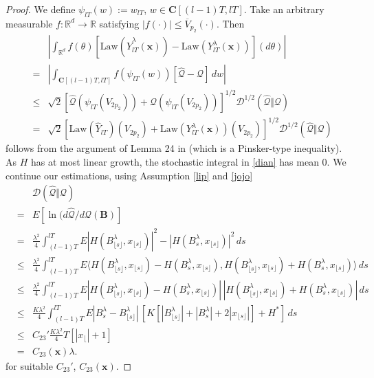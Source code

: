 \documentclass[a4paper,draft]{article}
\begin{document}
\begin{proof}
We define $\psi_{lT}(w):=w_{lT}$, $w\in\mathbf{C}[(l-1)T,lT]$.
Take an arbitrary measurable $f:\mathbb{R}^d\to\mathbb{R}$ satisfying 
$|f(\cdot)|\leq \overline{V}_{p_2}(\cdot)$. Then 
\begin{eqnarray*}
& & \left| \int_{\mathbb{R}^d} f(\theta)
[\mathrm{Law}(\hat{Y}_{lT}^{\lambda}(\mathbf{x}))-\mathrm{Law}({Y}_{lT}^{\lambda}(\mathbf{x}))](d\theta)\right|\\
&=& 
\left| \int_{\mathbf{C}[(l-1)T,lT]} f(\psi_{lT}(w))[\hat{\mathcal{Q}}-
\mathcal{Q}]\, dw\right|\\
&\leq & \sqrt{2}[\hat{\mathcal{Q}}(\psi_{lT}(V_{2p_2}))+\mathcal{Q}(\psi_{lT}(V_{2p_2}))]^{1/2}
\mathcal{D}^{1/2}(\hat{\mathcal{Q}}\Vert\mathcal{Q})\\
&=& \sqrt{2}[\mathrm{Law}(\hat{Y}_{lT})(V_{2p_2})+\mathrm{Law}({Y}^{\lambda}_{lT}(\mathbf{x}))(V_{2p_2})]^{1/2}
\mathcal{D}^{1/2}(\hat{\mathcal{Q}}\Vert \mathcal{Q})
\end{eqnarray*}
follows from the argument of Lemma 24 in \cite{unadjusted} (which is a Pinsker-type inequality).
As $H$ has at most linear growth, the stochastic integral in \eqref{dian} 
has mean $0$. We continue our estimations, using Assumption \ref{lip} and \eqref{jojo}
\begin{eqnarray*}
& & \mathcal{D}(\hat{\mathcal{Q}}\Vert\mathcal{Q})\\
&=& E[\ln(d\hat{\mathcal{Q}}/d\mathcal{Q}(\mathbf{B})]\\
&=& \frac{\lambda^2}{4}\int_{(l-1)T}^{lT} 
E|H(B^{\lambda}_{\lfloor s\rfloor},x_{\lfloor s\rfloor})|^2
-|H(B^{\lambda}_s,x_{\lfloor s\rfloor})|^2\, ds\\
&\leq& \frac{\lambda^2}{4}\int_{(l-1)T}^{lT} 
E\langle H(B^{\lambda}_{\lfloor s\rfloor},x_{\lfloor s\rfloor})
-H(B^{\lambda}_s,x_{\lfloor s\rfloor}),H(B^{\lambda}_{\lfloor s\rfloor},x_{\lfloor s\rfloor})
+H(B^{\lambda}_s,x_{\lfloor s\rfloor})\rangle\, ds\\
&\leq& 
\frac{\lambda^2}{4}\int_{(l-1)T}^{lT} 
E|H(B^{\lambda}_{\lfloor s\rfloor},x_{\lfloor s\rfloor})
-H(B^{\lambda}_s,x_{\lfloor s\rfloor})|\, |H(B^{\lambda}_{\lfloor s\rfloor},x_{\lfloor s\rfloor})
+H(B^{\lambda}_s,x_{\lfloor s\rfloor})|\, ds\\
&\leq& \frac{K\lambda^2}{4} \int_{(l-1)T}^{lT} 
E|B^{\lambda}_s-B^{\lambda}_{\lfloor s\rfloor}|\, [K[|B^{\lambda}_{\lfloor s\rfloor}|+|B^{\lambda}_s|+
2|x_{\lfloor s\rfloor}|]+H^*] \, ds\\
&\leq & C_{23}'\frac{K\lambda^2}{4} T [|x_{\lfloor}|+1]\\
&=& C_{23}(\mathbf{x})\lambda.
\end{eqnarray*}
for suitable $C_{23}'$, $C_{23}(\mathbf{x})$.
\end{proof}
\end{document}
